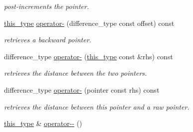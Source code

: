 \begin{DoxyCompactItemize}
\begin{DoxyCompactList}\small\item\em post-\/increments the pointer. \end{DoxyCompactList}\item 
\hypertarget{classhryky_1_1_intrusive_ptr_ac4f08eb767652220bbf2a379cf988bf0}{\hyperlink{classhryky_1_1_intrusive_ptr_a0fb00a7eafa8939e21653f677d1b2989}{this\-\_\-type} \hyperlink{classhryky_1_1_intrusive_ptr_ac4f08eb767652220bbf2a379cf988bf0}{operator-\/} (difference\-\_\-type const offset) const }\label{classhryky_1_1_intrusive_ptr_ac4f08eb767652220bbf2a379cf988bf0}

\begin{DoxyCompactList}\small\item\em retrieves a backward pointer. \end{DoxyCompactList}\item 
\hypertarget{classhryky_1_1_intrusive_ptr_a3952428634c9139f288f8bc08fcdcb6c}{difference\-\_\-type \hyperlink{classhryky_1_1_intrusive_ptr_a3952428634c9139f288f8bc08fcdcb6c}{operator-\/} (\hyperlink{classhryky_1_1_intrusive_ptr_a0fb00a7eafa8939e21653f677d1b2989}{this\-\_\-type} const \&rhs) const }\label{classhryky_1_1_intrusive_ptr_a3952428634c9139f288f8bc08fcdcb6c}

\begin{DoxyCompactList}\small\item\em retrieves the distance between the two pointers. \end{DoxyCompactList}\item 
\hypertarget{classhryky_1_1_intrusive_ptr_a3b15bb043f8480d4aa98d757ec5f66fa}{difference\-\_\-type \hyperlink{classhryky_1_1_intrusive_ptr_a3b15bb043f8480d4aa98d757ec5f66fa}{operator-\/} (pointer const rhs) const }\label{classhryky_1_1_intrusive_ptr_a3b15bb043f8480d4aa98d757ec5f66fa}

\begin{DoxyCompactList}\small\item\em retrieves the distance between this pointer and a raw pointer. \end{DoxyCompactList}\item 
\hypertarget{classhryky_1_1_intrusive_ptr_a87fa7ed8e3b31f421c164aaf3091efaf}{\hyperlink{classhryky_1_1_intrusive_ptr_a0fb00a7eafa8939e21653f677d1b2989}{this\-\_\-type} \& \hyperlink{classhryky_1_1_intrusive_ptr_a87fa7ed8e3b31f421c164aaf3091efaf}{operator-\/-\/} ()}\label{classhryky_1_1_intrusive_ptr_a87fa7ed8e3b31f421c164aaf3091efaf}


\end{DoxyCompactItemize}
